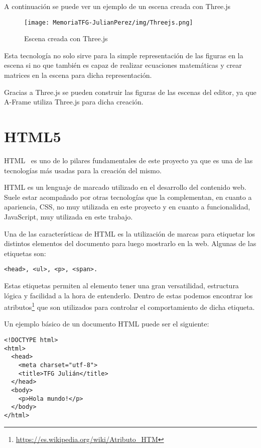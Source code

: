 \documentclass[a4paper, 12pt]{book}
\begin{document}
A continuación se puede ver un ejemplo de un escena creada con Three.js
\begin{figure}[H]
  \centering
  \texttt{[image: MemoriaTFG-JulianPerez/img/Threejs.png]}
  \caption{Escena creada con Three.js}\label{fig:three}
\end{figure}

Esta tecnología no solo sirve para la simple representación de las figuras en la escena si no que también es capaz de realizar ecuaciones matemáticas y crear matrices en la escena para dicha representación.

Gracias a Three.js se pueden construir las figuras de las escenas del editor, ya que A-Frame utiliza Three.js para dicha creación.

\section{HTML5} %
\label{sec:HTML5}
HTML~\cite{HTML} es uno de lo pilares fundamentales de este proyecto ya que es una de las tecnologías más usadas para la creación del mismo.

HTML es un lenguaje de marcado utilizado en el desarrollo del contenido web. Suele estar acompañado por otras tecnologías que la complementan, en cuanto a apariencia, CSS, no muy utilizada en este proyecto y en cuanto a funcionalidad, JavaScript, muy utilizada en este trabajo.

Una de las características de HTML es la utilización de marcas para etiquetar los distintos elementos del documento para luego mostrarlo en la web. Algunas de las etiquetas son: \begin{verbatim}<head>, <ul>, <p>, <span>.\end{verbatim} 

Estas etiquetas permiten al elemento tener una gran versatilidad, estructura lógica y facilidad a la hora de entenderlo. Dentro de estas podemos encontrar los atributos\footnote{\url{https://es.wikipedia.org/wiki/Atributo_HTM}} que son utilizados para controlar el comportamiento de dicha etiqueta.

Un ejemplo básico de un documento HTML puede ser el siguiente:

\begin{verbatim}
<!DOCTYPE html>
<html>
  <head>
    <meta charset="utf-8">
    <title>TFG Julián</title>
  </head>
  <body>
    <p>Hola mundo!</p>
  </body>
</html>
\end{verbatim}
\end{document}
